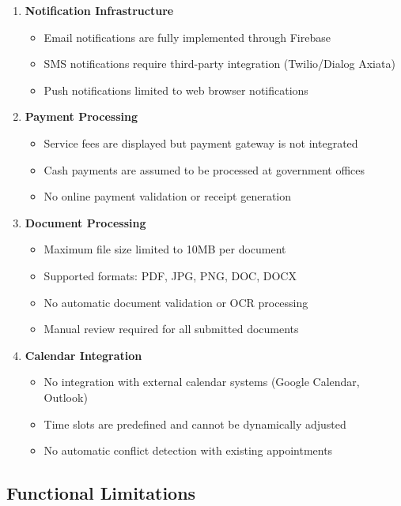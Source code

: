 \documentclass[11pt,a4paper]{article}
\begin{document}
\begin{enumerate}[leftmargin=*]
    \item \textbf{Notification Infrastructure}
    \begin{itemize}
        \item Email notifications are fully implemented through Firebase
        \item SMS notifications require third-party integration (Twilio/Dialog Axiata)
        \item Push notifications limited to web browser notifications
    \end{itemize}
    
    \item \textbf{Payment Processing}
    \begin{itemize}
        \item Service fees are displayed but payment gateway is not integrated
        \item Cash payments are assumed to be processed at government offices
        \item No online payment validation or receipt generation
    \end{itemize}
    
    \item \textbf{Document Processing}
    \begin{itemize}
        \item Maximum file size limited to 10MB per document
        \item Supported formats: PDF, JPG, PNG, DOC, DOCX
        \item No automatic document validation or OCR processing
        \item Manual review required for all submitted documents
    \end{itemize}
    
    \item \textbf{Calendar Integration}
    \begin{itemize}
        \item No integration with external calendar systems (Google Calendar, Outlook)
        \item Time slots are predefined and cannot be dynamically adjusted
        \item No automatic conflict detection with existing appointments
    \end{itemize}
\end{enumerate}

\subsection{Functional Limitations}
\end{document}
